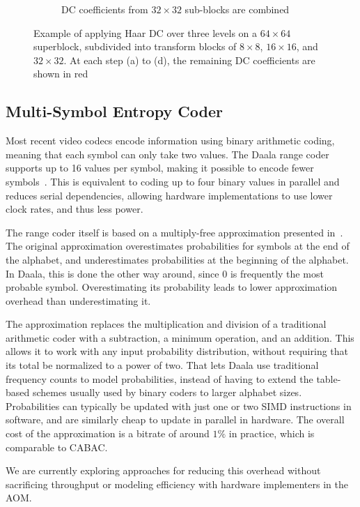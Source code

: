 \documentclass[english,conference,10pt]{IEEEtran}
\begin{document}
\begin{figure}
\begin{subfigure}[t]{0.49\columnwidth}
\caption{DC coefficients from $32\times 32$ sub-blocks are combined}
\end{subfigure}
\caption{Example of applying Haar DC over three levels on a $64\times 64$
superblock, subdivided into transform blocks of $8 \times 8$, $16 \times 16$,
and $32 \times 32$. At each step (a) to (d), the remaining DC coefficients
are shown in red\label{fig:haardc}}

\end{figure}

\subsection{Multi-Symbol Entropy Coder}

Most recent video codecs encode information using binary arithmetic
coding, meaning that each symbol can only take two values. The Daala
range coder supports up to 16 values per symbol, making it possible
to encode fewer symbols~\cite{derfTools}. This is equivalent to
coding up to four binary values in parallel and reduces serial dependencies,
allowing hardware implementations to use lower clock rates, and thus less
power.

The range coder itself is based on a multiply-free approximation presented
in~\cite{stuiver1998piecewise}. The original approximation overestimates
probabilities for symbols at the end of the alphabet, and underestimates
probabilities at the beginning of the alphabet. In Daala, this is done the
other way around, since $0$ is frequently the most probable symbol.
Overestimating its probability leads to lower approximation overhead than
underestimating it.

The approximation replaces the multiplication and division of a traditional
arithmetic coder with a subtraction, a minimum operation, and an addition. This
allows it to work with any input probability distribution, without requiring
that its total be normalized to a power of two. That lets Daala use traditional
frequency counts to model probabilities, instead of having to extend the
table-based schemes usually used by binary coders to larger alphabet sizes.
Probabilities can typically be updated with just one or two SIMD instructions
in software, and are similarly cheap to update in parallel in hardware. The
overall cost of the approximation is a bitrate of around $1\%$ in practice,
which is comparable to CABAC\@.

We are currently exploring approaches for reducing this overhead without
sacrificing throughput or modeling efficiency with hardware implementers in the
AOM\@.
\end{document}
